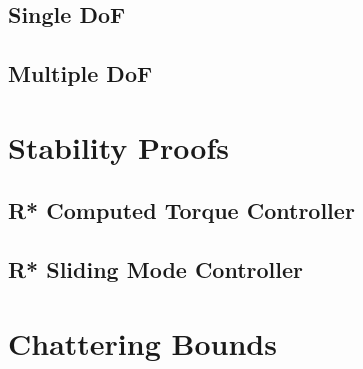 \subsection{Single DoF}
\label{sec:optgearproof1}


\subsection{Multiple DoF}
\label{sec:optgearproofn}


\section{Stability Proofs}
\label{sec:stabproofs}


\subsection{R* Computed Torque Controller}
\label{sec:stabrstar}


\subsection{R* Sliding Mode Controller}
\label{sec:stabrstar}


\section{Chattering Bounds}
\label{sec:chat}

